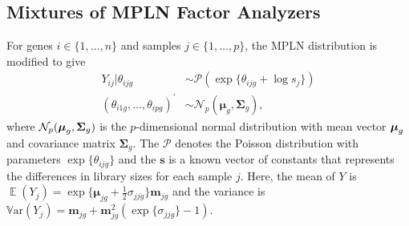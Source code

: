 \documentclass[12pt]{article}
\newcommand{\vecmu}{\mbox{\boldmath$\mu$}}
\DeclareMathOperator{\E}{\mathbb{E}}
\begin{document}
\subsection{Mixtures of MPLN Factor Analyzers}
For genes $i \in \{1,\ldots, n\}$ and samples $j \in \{1,\ldots,p\}$, the MPLN distribution is modified to give
\begin{equation*}\begin{split}
\label{eqn:MPLN2}
                  Y_{ij} | \theta_{ijg} &\sim \mathscr{P}(\exp\{\theta_{ijg}+\log s_{j}\} )\\
                  (\theta_{i1g}, \ldots,\theta_{ipg})^{\prime} &\sim \mathscr{N}_{p}(\boldsymbol{\mu}_g,\boldsymbol{\Sigma}_g),
\end{split}
\end{equation*}
where $\mathcal{N}_p(\vecmu_g,\mathbf{\Sigma}_g)$ is the $p$-dimensional normal distribution with mean vector $\vecmu_g$ and covariance matrix $\mathbf{\Sigma}_g$. The $\mathscr{P}$ denotes the Poisson distribution with parameters $\exp\{\theta_{ijg}\}$ and the $\mathbf{s}$ is a known vector of constants that represents the differences in library sizes for each sample $j$. Here, the mean of $Y$ is $\E(Y_j) = \exp\{\boldsymbol{\mu}_{jg} + \frac{1}{2} \sigma_{jjg} \}  \boldsymbol{m}_{jg}$ and the variance is $\mathbb{V}\text{ar}(Y_j) = \boldsymbol{m}_{jg} + \boldsymbol{m}_{jg}^2 (\exp\{\sigma_{jjg}\} - 1)$. 
\end{document}
